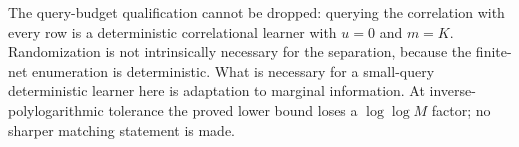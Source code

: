The query-budget qualification cannot be dropped: querying the correlation with every row is a deterministic correlational learner with $u=0$ and $m=K$. Randomization is not intrinsically necessary for the separation, because the finite-net enumeration is deterministic. What is necessary for a small-query deterministic learner here is adaptation to marginal information. At inverse-polylogarithmic tolerance the proved lower bound loses a $\log\log M$ factor; no sharper matching statement is made.
